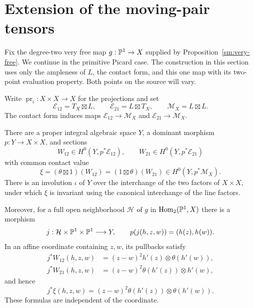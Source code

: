 \section{Extension of the moving-pair tensors}
\label{ext:section}

Fix the degree-two very free map $g:\mathbb P^1\to X$ supplied by
Proposition~\ref{sm:very-free}. We continue in the primitive Picard
case. The construction in this section uses only the ampleness of $L$,
the contact form, and this one map with its two-point evaluation
property. Both points on the source will vary.

Write $\operatorname{pr}_i:X\times X\to X$ for the projections and set
\[
\mathcal E_{12}=T_X\boxtimes L,\qquad
\mathcal E_{21}=L\boxtimes T_X,\qquad
\mathcal M_X=L\boxtimes L.
\]
The contact form induces maps $\mathcal E_{12}\to\mathcal M_X$ and
$\mathcal E_{21}\to\mathcal M_X$.

\begin{proposition}
\label{ext:moving-pair}
There are a proper integral algebraic space $Y$, a dominant morphism
$p:Y\to X\times X$, and sections
\[
W_{12}\in H^0(Y,p^*\mathcal E_{12}),\qquad
W_{21}\in H^0(Y,p^*\mathcal E_{21})
\]
with common contact value
\[
\xi=(\theta\boxtimes 1)(W_{12})
     =(1\boxtimes\theta)(W_{21})
\in H^0(Y,p^*\mathcal M_X).
\]
There is an involution $\iota$ of $Y$ over the interchange of the two
factors of $X\times X$, under which $\xi$ is invariant using the
canonical interchange of the line factors.

Moreover, for a full open neighborhood $\mathcal H$ of $g$ in
$\operatorname{Hom}_2(\mathbb P^1,X)$ there is a morphism
\[
j:\mathcal H\times\mathbb P^1\times\mathbb P^1\longrightarrow Y,
\qquad p(j(h,z,w))=(h(z),h(w)).
\]
In an affine coordinate containing $z,w$, its pullbacks satisfy
\begin{equation}\label{ext:hom-vectors}
\begin{aligned}
j^*W_{12}(h,z,w)
  &=(z-w)^2h'(z)\otimes\theta(h'(w)),\\
j^*W_{21}(h,z,w)
  &=(z-w)^2\theta(h'(z))\otimes h'(w),
\end{aligned}
\end{equation}
and hence
\begin{equation}\label{ext:hom-identity}
j^*\xi(h,z,w)
  =(z-w)^2\theta(h'(z))\otimes\theta(h'(w)).
\end{equation}
These formulas are independent of the coordinate.
\end{proposition}

